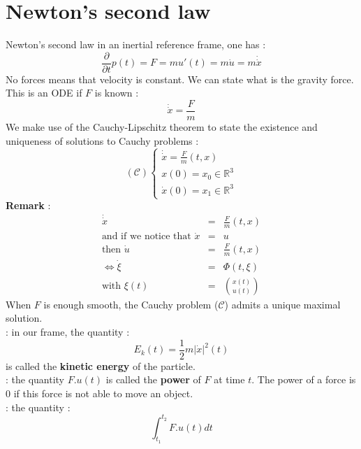 \documentclass{report}
\newcommand*{\bfrac}[2]{\genfrac{(}{)}{0pt}{}{#1}{#2}}
\newcommand*{\definition}[1]{\noindent\textbf{\color{cadmiumgreen}{#1}}}
\theoremstyle{plain}
\theoremstyle{definition}
\theoremstyle{remark}
\begin{document}
\section{Newton's second law}
Newton's second law in an inertial reference frame, one has :
\begin{equation}
\frac{\partial}{\partial t}p(t) = F = mu'(t) = m \dot{u} = m \dot{\dot{x}}
\end{equation}
No forces means that velocity is constant. We can state what is the gravity force. \\
This is an ODE if $F$ is known : 
\begin{equation}
\dot{\dot{x}} = \frac{F}{m}
\end{equation}
We make use of the Cauchy-Lipschitz theorem to state the existence and uniqueness of solutions to Cauchy problems :
\begin{equation}
	(\mathcal{C})
	\left\lbrace
	\begin{array}{l}
        \dot{\dot{x}} = \frac{F}{m}(t,x) \\
 x(0) = x_0 \in \mathbb{R}^3 \\
\dot{x}(0) = x_1 \in \mathbb{R}^3
    \end{array}
    \right.
\end{equation}
\textbf{Remark} :
\begin{eqnarray*}
\dot{\dot{x}} &=& \frac{F}{m}(t,x) \\
\text{and if we notice that } \dot{x} &=& u \\
\text{then } \dot{u} &=& \frac{F}{m}(t,x) \\
\Leftrightarrow \dot{\xi} &=& \Phi(t,\xi) \\
\text{with } \xi(t) &=& \bfrac{x(t)}{u(t)}
\end{eqnarray*}
When $F$ is enough smooth, the Cauchy problem ($\mathcal{C}$) admits a unique maximal solution. \\
\definition{Kinetic energy} : in our frame, the quantity :
\begin{equation}
E_k(t) = \frac{1}{2}m\vert\dot{x}\vert^2(t)
\end{equation}
is called the \textbf{kinetic energy} of the particle. \\
\definition{Power} : the quantity $F.u(t)$ is called the \textbf{power} of $F$ at time $t$.
The power of a force is 0 if this force is not able to move an object. \\
\definition{Work} : the quantity :
\begin{equation}
\int_{t_1}^{t_2}F.u(t)dt
\end{equation}
\end{document}
